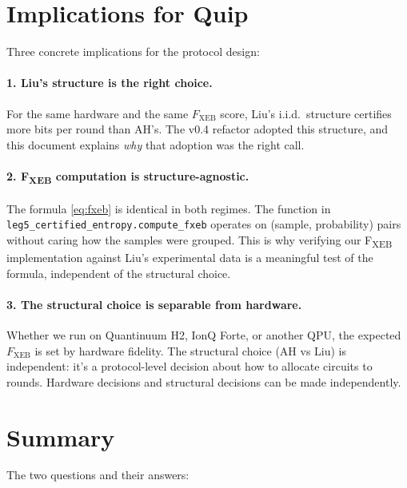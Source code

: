 \documentclass[11pt]{article}
\theoremstyle{definition}
\theoremstyle{remark}
\begin{document}

\section{Implications for Quip}

Three concrete implications for the protocol design:

\paragraph{1. Liu's structure is the right choice.} For the same hardware
and the same $F_{\mathrm{XEB}}$ score, Liu's i.i.d.\ structure certifies more
bits per round than AH's. The v0.4 refactor adopted this structure, and
this document explains \emph{why} that adoption was the right call.

\paragraph{2. F\textsubscript{XEB} computation is structure-agnostic.}
The formula \eqref{eq:fxeb} is identical in both regimes. The function in
\texttt{leg5\_certified\_entropy.compute\_fxeb} operates on (sample,
probability) pairs without caring how the samples were grouped. This is
why verifying our F\textsubscript{XEB} implementation against Liu's
experimental data is a meaningful test of the formula, independent of the
structural choice.

\paragraph{3. The structural choice is separable from hardware.} Whether
we run on Quantinuum H2, IonQ Forte, or another QPU, the
expected $F_{\mathrm{XEB}}$ is set by hardware fidelity. The structural
choice (AH vs Liu) is independent: it's a protocol-level decision about
how to allocate circuits to rounds. Hardware decisions and structural
decisions can be made independently.

\section{Summary}

The two questions and their answers:
\end{document}
